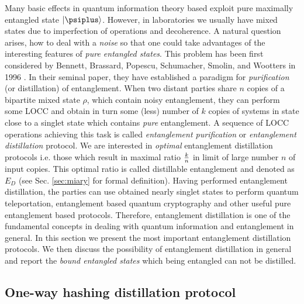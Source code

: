 \documentclass[rmp,12pt,preprint]{revtex4-2}
\begin{document}
Many basic effects in quantum information theory based exploit pure
maximally entangled state $|\psiplus \rangle$.  However, in
laboratories we usually have mixed states due to imperfection of
operations and decoherence. A natural question arises, how to deal
with a {\it noise} so that one could take advantages of the
interesting features of {\it pure entangled states}. This problem has
been first considered by Bennett, Brassard, Popescu, Schumacher,
Smolin, and Wootters in 1996 \cite{BBPSSW1996}. In their seminal
paper, they have established a paradigm for {\it purification} (or
distillation) of entanglement.  When two distant parties share $n$
copies of a bipartite mixed state $\rho$, which contain noisy
entanglement, they can perform some LOCC and obtain in turn some
(less) number of $k$ copies of systems in state close to a singlet
state which contains {\it pure} entanglement. A sequence of LOCC
operations achieving this task is called {\it entanglement
  purification} or {\it entanglement distillation} protocol. We are
interested in {\it optimal} entanglement distillation protocols
i.e. those which result in maximal ratio $k\over n$ in limit of large
number $n$ of input copies. This optimal ratio is called distillable
entanglement and denoted as $E_D$ (see Sec. \ref{sec:miary} for formal
definition). Having performed entanglement distillation, the parties
can use obtained nearly singlet states to perform quantum
teleportation, entanglement based quantum cryptography and other
useful pure entanglement based protocols. Therefore, entanglement
distillation is one of the fundamental concepts in dealing with
quantum information and entanglement in general. In this section we
present the most important entanglement distillation protocols. We
then discuss the possibility of entanglement distillation in general
and report the {\it bound entangled states} which being entangled can
not be distilled.



\subsection{One-way hashing distillation protocol}
\label{subsec:onewayhash}
\end{document}
